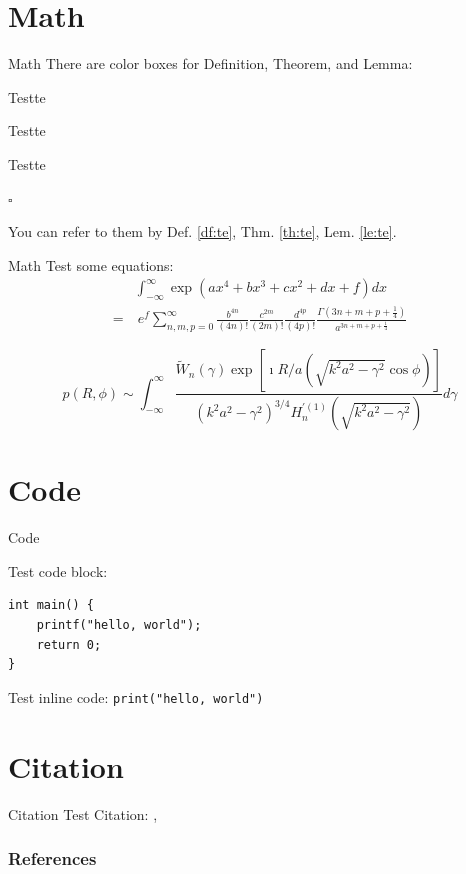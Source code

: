 \documentclass[pdf,serif]{beamer}
\renewenvironment{proof}{{\large {\color{BerkeleyBlue}\textit{Proof.}}}}{\hfill$\square$}
\begin{document}
\section{Math}
\begin{frame}{Math}
There are color boxes for Definition, Theorem, and Lemma:
\begin{defi}{Test}{te}
\end{defi}
\begin{thm}{Test}{te}
\end{thm}
\begin{lem}{Test}{te}
\end{lem}
\begin{proof}
\end{proof}

You can refer to them by Def. \ref{df:te}, Thm. \ref{th:te}, Lem. \ref{le:te}. 
\end{frame}

\begin{frame}{Math}
	Test some equations:
	$$
	\begin{aligned}
		&\int_{-\infty}^{\infty} \exp \left(a x^4+b x^3+c x^2+d x+f\right) d x\\
		=&\ e^f \sum_{n, m, p=0}^{\infty} \frac{b^{4 n}}{(4 n) !} \frac{c^{2 m}}{(2 m) !} \frac{d^{4 p}}{(4 p) !} \frac{\Gamma\left(3 n+m+p+\frac{1}{4}\right)}{a^{3 n+m+p+\frac{1}{4}}}
	\end{aligned}
	$$

	$$
	p(R, \phi) \sim \int_{-\infty}^{\infty} \frac{\tilde{W}_n(\gamma) \exp \left[\imath R / a\left(\sqrt{k^2 a^2-\gamma^2} \cos \phi\right)\right]}{\left(k^2 a^2-\gamma^2\right)^{3 / 4} H_n^{\prime(1)}\left(\sqrt{k^2 a^2-\gamma^2}\right)} d \gamma
	$$
\end{frame}

\section{Code}

\begin{frame}[fragile]{Code}

Test code block:

\begin{verbatim}
int main() {
	printf("hello, world");
	return 0;
}
\end{verbatim}

Test inline code: \texttt{print("hello, world")}
\end{frame}

\section{Citation} 

\begin{frame}{Citation}
	Test Citation: \citep{qu2023data}, \citet{qu2023data}
\end{frame}

\begin{frame}[t, allowframebreaks]
	\frametitle{References}
	
	\scriptsize
	
\end{frame}
\end{document}
